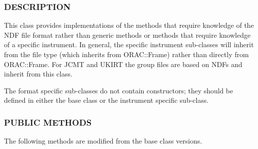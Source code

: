 \subsubsection*{DESCRIPTION\label{ORAC::Frame::NDF_DESCRIPTION}}

This class provides implementations of the methods that require
knowledge of the NDF file format rather than generic methods or
methods that require knowledge of a specific instrument.  In general,
the specific instrument sub-classes will inherit from the file type
(which inherits from ORAC::Frame) rather than directly from
ORAC::Frame. For JCMT and UKIRT the group files are based on NDFs and
inherit from this class.



The format specific sub-classes do not contain constructors; they 
should be defined in either the base class or the instrument specific
sub-class.

\subsubsection*{PUBLIC METHODS\label{ORAC::Frame::NDF_PUBLIC_METHODS}}

The following methods are modified from the base class versions.

